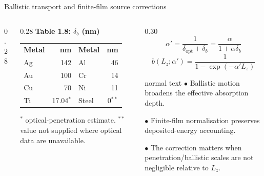 \documentclass[aspectratio=169,10pt]{beamer}
\begin{document}
\begin{frame}[t]{Ballistic transport and finite-film source corrections}
  \hypertarget{supp:physics-ballistic}{}
  \vspace{-0.18cm}\hfill
  \hspace{0.10cm}\GVBackupIndexButton
  \vspace{0.02cm}
  \begin{columns}[T,totalwidth=0.95\textwidth]
    \begin{column}{0.28\textwidth}
      \centering
    \end{column}
    \begin{column}{0.28\textwidth}
      \small\textbf{\color{GVTeal}Table 1.8: \(\delta_b\) (nm)}\par
      \vspace{0.06cm}\centering\scriptsize
      \begin{tabular}{@{}lr@{\qquad}lr@{}}
        \rowcolor{GVTealTint}\textbf{Metal} & \textbf{nm} & \textbf{Metal} & \textbf{nm}\\
        Ag & 142 & Al & 46\\
        Au & 100 & Cr & 14\\
        Cu & 70 & Ni & 11\\
        Ti & 17.04\(^*\) & Steel & 0\(^{**}\)
      \end{tabular}\par
      \vspace{0.14cm}\scriptsize\color{GVSlate}
      \(^*\) optical-penetration estimate. \(^{**}\) value not supplied where optical data are unavailable.
    \end{column}
    \begin{column}{0.30\textwidth}
      \[
      \alpha'=\frac{1}{\delta_{\mathrm{opt}}+\delta_b}
      =\frac{\alpha}{1+\alpha\delta_b}
      \]
      \vspace{-0.28cm}
      \[
      b(L_z;\alpha')=\frac{1}{1-\exp(-\alpha'L_z)}
      \]
      \vspace{0.04cm}
      \begin{beamercolorbox}[wd=\linewidth,sep=0.40em]{normal text}
        \scriptsize
        \(\bullet\) Ballistic motion broadens the effective absorption depth.\par
        \vspace{0.11cm}
        \(\bullet\) Finite-film normalisation preserves deposited-energy accounting.\par
        \vspace{0.11cm}
        \(\bullet\) The correction matters when penetration/ballistic scales are not negligible relative to \(L_z\).
      \end{beamercolorbox}
    \end{column}
  \end{columns}
\end{frame}
\end{document}
